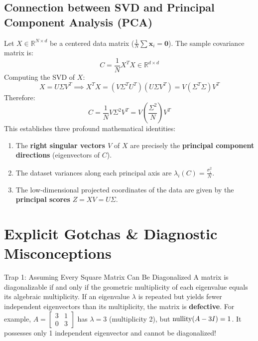 \subsection{Connection between SVD and Principal Component Analysis (PCA)}

Let $X \in \mathbb{R}^{N \times d}$ be a centered data matrix ($\frac{1}{N}\sum \mathbf{x}_i = \mathbf{0}$).
The sample covariance matrix is:
\begin{equation}
C = \frac{1}{N} X^T X \in \mathbb{R}^{d \times d}
\end{equation}
Computing the SVD of $X$:
\begin{equation}
X = U \Sigma V^T \implies X^T X = (V \Sigma^T U^T)(U \Sigma V^T) = V (\Sigma^T \Sigma) V^T
\end{equation}
Therefore:
\begin{equation}
C = \frac{1}{N} V \Sigma^2 V^T = V \left( \frac{\Sigma^2}{N} \right) V^T
\end{equation}
This establishes three profound mathematical identities:
\begin{enumerate}
    \item The \textbf{right singular vectors $V$} of $X$ are precisely the \textbf{principal component directions} (eigenvectors of $C$).
    \item The dataset variances along each principal axis are $\lambda_i(C) = \frac{\sigma_i^2}{N}$.
    \item The low-dimensional projected coordinates of the data are given by the \textbf{principal scores} $Z = X V = U \Sigma$.
\end{enumerate}

\section{Explicit Gotchas \& Diagnostic Misconceptions}

\begin{trapbox}{Trap 1: Assuming Every Square Matrix Can Be Diagonalized}
A matrix is diagonalizable if and only if the geometric multiplicity of each eigenvalue equals its algebraic multiplicity. If an eigenvalue $\lambda$ is repeated but yields fewer independent eigenvectors than its multiplicity, the matrix is \textbf{defective}. For example, $A = \begin{bmatrix} 3 & 1 \\ 0 & 3 \end{bmatrix}$ has $\lambda = 3$ (multiplicity 2), but $\operatorname{nullity}(A - 3I) = 1$. It possesses only 1 independent eigenvector and cannot be diagonalized!
\end{trapbox}

